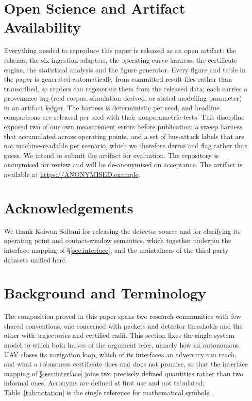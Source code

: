 \section{Open Science and Artifact Availability}
\label{sec:openscience}
Everything needed to reproduce this paper is released as an open artifact: the
schema, the six ingestion adapters, the operating-curve harness, the certificate
engine, the statistical analysis and the figure generator. Every figure and
table in the paper is generated automatically from committed result files rather
than transcribed, so readers can regenerate them from the released data; each
carries a provenance tag (real corpus, simulation-derived, or stated modelling
parameter) in an artifact ledger. The harness is deterministic per seed,
and headline comparisons are released per seed with their
nonparametric tests. This discipline exposed two of our own measurement errors
before publication: a sweep harness that accumulated across operating points,
and a set of bus-attack labels that are not machine-readable per scenario, which
we therefore derive and flag rather than guess. We intend to submit the artifact for evaluation.
\ifanon
The repository is anonymised for review and will be de-anonymised on acceptance.
\else
The artifact is available at \url{https://ANONYMISED.example}.
\fi

\ifanon\else

\section*{Acknowledgements}
We thank Keiwan Soltani for releasing the  detector source and
for clarifying its operating point and contact-window semantics, which together
underpin the interface mapping of \S\ref{sec:interface}, and the maintainers of
the third-party datasets unified here.
\fi




\appendix

\section{Background and Terminology}
\label{sec:background}
The composition proved in this paper spans two research communities with few
shared conventions, one concerned with packets and detector thresholds and the
other with trajectories and certified radii. This section fixes the single
system model to which both halves of the argument refer, namely how an
autonomous UAV closes its navigation loop, which of its interfaces an adversary
can reach, and what a robustness certificate does and does not promise, so that
the interface mapping of \S\ref{sec:interface} joins two precisely defined
quantities rather than two informal ones. Acronyms are defined at first use and
not tabulated; Table~\ref{tab:notation} is the single reference for
mathematical symbols.

